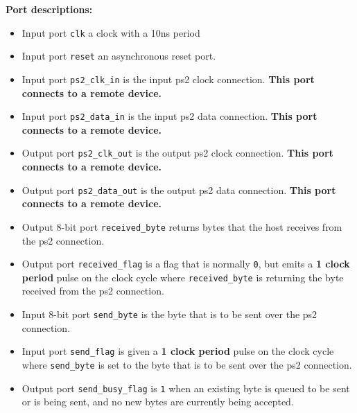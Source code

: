 \documentclass{article}
\begin{document}
{\bf Port descriptions:}
\begin{itemize}
\item Input port \texttt{clk} a clock with a 10ns period
\item Input port \texttt{reset} an asynchronous reset port.  
\item Input port \texttt{ps2\_clk\_in} is the input ps2 clock connection. {\bf This port connects to a remote device.} 
\item Input port \texttt{ps2\_data\_in} is the input ps2 data connection. {\bf This port connects to a remote device.} 
\item Output port \texttt{ps2\_clk\_out} is the output ps2 clock connection. {\bf This port connects to a remote device.} 
\item Output port \texttt{ps2\_data\_out} is the output ps2 data connection. {\bf This port connects to a remote device.} 
\item Output \(8\)-bit port \texttt{received\_byte} returns bytes that the host receives from the ps2 connection. 
\item Output port \texttt{received\_flag} is a flag that is normally \texttt{0}, but emits a {\bf 1 clock period} pulse on the clock cycle where \texttt{received\_byte} is returning the byte received from the ps2 connection. 
\item Input \(8\)-bit port \texttt{send\_byte} is the byte that is to be sent over the ps2 connection. 
\item Input port \texttt{send\_flag} is given a {\bf 1 clock period} pulse on the clock cycle where \texttt{send\_byte} is set to the byte that is to be sent over the ps2 connection. 
\item Output port \texttt{send\_busy\_flag} is \texttt{1} when an existing byte is queued to be sent or is being sent, and no new bytes are currently being accepted.         
\end{itemize}
\end{document}
